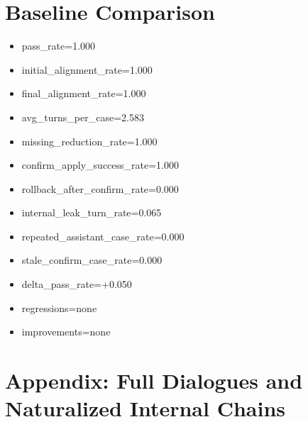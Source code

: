 \documentclass[11pt]{ctexart}
\begin{document}
\section{Baseline Comparison}
\begin{itemize}
\item pass\_rate=1.000
\item initial\_alignment\_rate=1.000
\item final\_alignment\_rate=1.000
\item avg\_turns\_per\_case=2.583
\item missing\_reduction\_rate=1.000
\item confirm\_apply\_success\_rate=1.000
\item rollback\_after\_confirm\_rate=0.000
\item internal\_leak\_turn\_rate=0.065
\item repeated\_assistant\_case\_rate=0.000
\item stale\_confirm\_case\_rate=0.000
\item delta\_pass\_rate=+0.050
\item regressions=none
\item improvements=none
\end{itemize}
\appendix
\section{Appendix: Full Dialogues and Naturalized Internal Chains}
\end{document}
